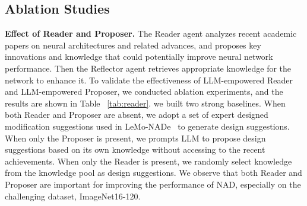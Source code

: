\subsection{Ablation Studies}
\textbf{Effect of Reader and Proposer.} 
The Reader agent analyzes recent academic papers on neural architectures and related advances, and proposes key innovations and knowledge that could potentially improve neural network performance. 
Then the Reflector agent retrieves appropriate knowledge for the network to enhance it.
To validate the effectiveness of LLM-empowered Reader and LLM-empowered Proposer, we conducted ablation experiments, and the results are shown in Table ~\ref{tab:reader}.
we built two strong baselines.
When both Reader and Proposer are absent, we adopt a set of expert designed modification suggestions used in LeMo-NADe~\cite{rahman2024lemo} to generate design suggestions.
When only the Proposer is present, we prompts LLM to propose design suggestions based on its own knowledge without accessing to the recent achievements. 
When only the Reader is present, we randomly select knowledge from the knowledge pool as design suggestions.
We observe that both Reader and Proposer are important for improving the performance of NAD, especially on the challenging dataset, \ie ImageNet16-120. 

\begin{table}[t]
    \centering
    \caption{Ablation studies of the Developer Team. Experiments are conducted on our NAD benchmark. ``LIF'' and ``LDE'' mean learning from immediate feedback and learning from design experience respectively.
    }
    \label{tab:develop_team}
\end{table}

